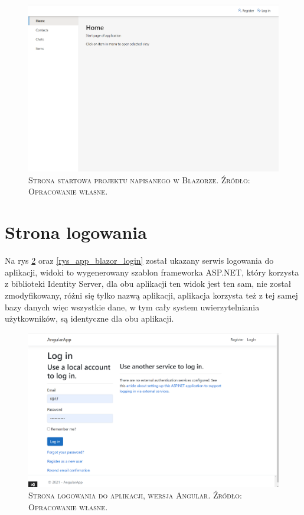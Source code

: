 \documentclass[12pt,a4paper,oneside]{book}
\newcommand{\captionT}[1]{\caption{\textsc{\footnotesize{#1}}}}
\begin{document}
\begin{figure}[H]
\centering
\includegraphics[width=1\textwidth]{images/BlazorApp/BlazorStronaStartowa.pdf}
\captionT{Strona startowa projektu napisanego w Blazorze. Źródło: Opracowanie własne.}
\label{rys_app_blazor_home}
\end{figure}

\section{Strona logowania}

Na rys \ref{rys_app_angular_login} oraz \ref{rys_app_blazor_login} został ukazany serwis logowania do aplikacji, widoki to wygenerowany szablon frameworka ASP.NET, który korzysta z biblioteki Identity Server, dla obu aplikacji ten widok jest ten sam, nie został zmodyfikowany, różni się tylko nazwą aplikacji, aplikacja korzysta też z tej samej bazy danych więc wszystkie dane, w tym cały system uwierzytelniania użytkowników, są identyczne dla obu aplikacji.

\begin{figure}[H]
\centering
\includegraphics[width=1\textwidth]{images/AngularApp/AngularStronaLogowania.pdf}
\captionT{Strona logowania do aplikacji, wersja Angular. Źródło: Opracowanie własne.}
\label{rys_app_angular_login}
\end{figure}
\end{document}
